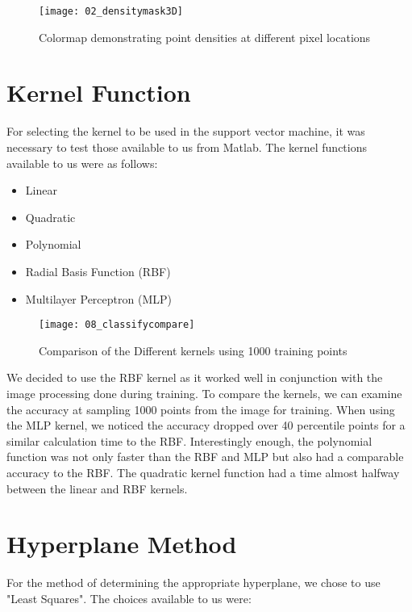 \begin{figure}[ht]
    \centering
    \texttt{[image: 02\_densitymask3D]}
    \caption{Colormap demonstrating point densities at different pixel locations}
    \label{fig:02_densitymask3D}
\end{figure}


\section{Kernel Function}

For selecting the kernel to be used in the support vector machine, it was necessary to test those available to us from Matlab. The kernel functions available to us were as follows:

\begin{itemize}
  \item Linear
  \item Quadratic
  \item Polynomial
  \item Radial Basis Function (RBF)
  \item Multilayer Perceptron (MLP)
\end{itemize}

\begin{figure}[ht]
    \centering
    \texttt{[image: 08\_classifycompare]}
    \caption{Comparison of the Different kernels using 1000 training points}
    \label{fig:08_classifycompare}
\end{figure}

We decided to use the RBF kernel as it worked well in conjunction with the image processing done during training. To compare the kernels, we can examine the accuracy at sampling 1000 points from the image for training. When using the MLP kernel, we noticed the accuracy dropped over 40 percentile points for a similar calculation time to the RBF. Interestingly enough, the polynomial function was not only faster than the RBF and MLP but also had a comparable accuracy to the RBF. The quadratic kernel function had a time almost halfway between the linear and RBF kernels.


\section{Hyperplane Method}

For the method of determining the appropriate hyperplane, we chose to use "Least Squares". The choices available to us were:

